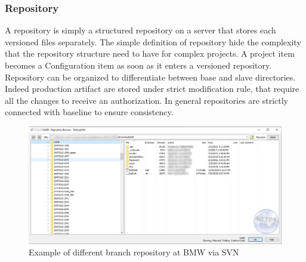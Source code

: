 \documentclass[../main.tex]{subfiles}
\begin{document}
\subsubsection{Repository}
A repository is simply a structured repository on a server that stores each versioned files separately. The simple definition of repository hide the complexity that the repository structure need to have for complex projects. A project item becomes a Configuration item as soon as it enters a versioned repository. \\
Repository can be organized to differentiate between base and slave directories. Indeed production artifact are stored under strict modification rule, that require all the changes to receive an authorization.  In general repositories are strictly connected with baseline to ensure consistency. 
\begin{figure}[H]
    \centering
    \includegraphics[width=\linewidth]{images_folder/repobroswer.png.jpg}
    \caption{Example of different branch repository at \gls{BMW} via SVN}
    \label{fig:BMWREPO}
\end{figure}
\end{document}
